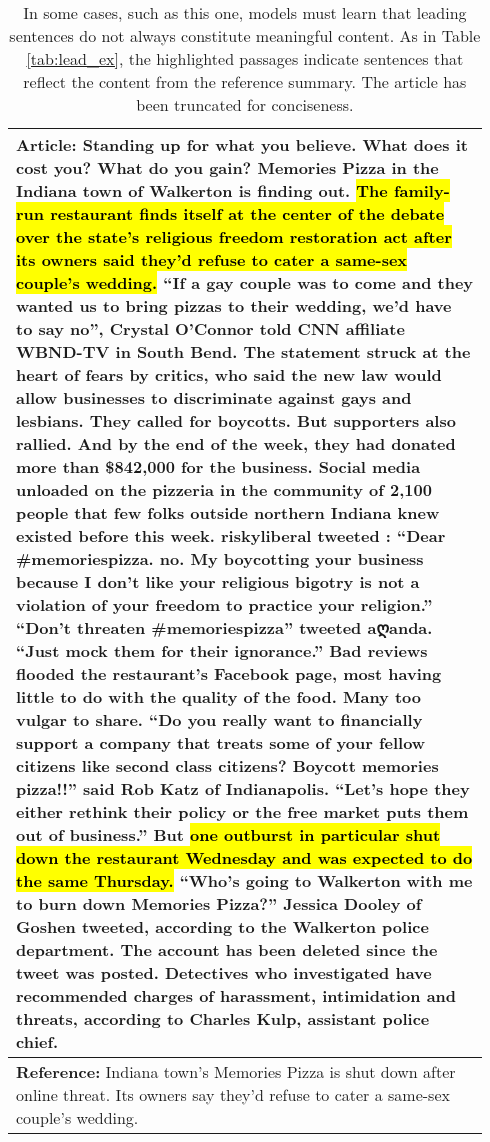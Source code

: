 \begin{table}[t]
    \centering
    \small
    \begin{tabular}{|p{0.94\linewidth}|}
        \hline
        \textbf{Article}: Standing up for what you believe. What does it cost you? What do you gain? Memories Pizza in the Indiana town of Walkerton is finding out. \hl{The family-run restaurant finds itself at the center of the debate over the state's religious freedom restoration act after its owners said they'd refuse to cater a same-sex couple's wedding.} ``If a gay couple was to come and they wanted us to bring pizzas to their wedding, we'd have to say no'', Crystal O'Connor told CNN affiliate WBND-TV in South Bend. The statement struck at the heart of fears by critics, who said the new law would allow businesses to discriminate against gays and lesbians. They called for boycotts. But supporters also rallied. And by the end of the week, they had donated more than \$842,000 for the business. Social media unloaded on the pizzeria in the community of 2,100 people that few folks outside northern Indiana knew existed before this week. riskyliberal tweeted : ``Dear \#memoriespizza. no. My boycotting your business because I don't like your religious bigotry is not a violation of your freedom to practice your religion.'' ``Don't threaten \#memoriespizza'' tweeted aღanda. ``Just mock them for their ignorance.'' Bad reviews flooded the restaurant's Facebook page, most having little to do with the quality of the food. Many too vulgar to share. ``Do you really want to financially support a company that treats some of your fellow citizens like second class citizens? Boycott memories pizza!!'' said Rob Katz of Indianapolis. ``Let's hope they either rethink their policy or the free market puts them out of business.'' But \hl{one outburst in particular shut down the restaurant Wednesday and was expected to do the same Thursday.} ``Who's going to Walkerton with me to burn down Memories Pizza?'' Jessica Dooley of Goshen tweeted, according to the Walkerton police department. The account has been deleted since the tweet was posted. Detectives who investigated have recommended charges of harassment, intimidation and threats, according to Charles Kulp, assistant police chief. \\ \hline
        \textbf{Reference:} Indiana town's Memories Pizza is shut down after online threat. Its owners say they'd refuse to cater a same-sex couple's wedding. \\ \hline
    \end{tabular}
    \caption[An example in which leading sentences form a poor summary.]{In some cases, such as this one, models must learn that leading sentences do not always constitute meaningful content. As in Table \ref{tab:lead_ex}, the highlighted passages indicate sentences that reflect the content from the reference summary. The article has been truncated for conciseness.}
    \label{tab:bad_lead}
\end{table}

